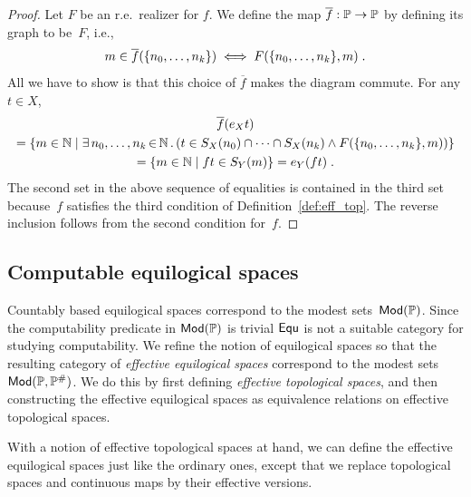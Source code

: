 \begin{proof}
  Let $F$ be an r.e.~realizer for $f$.  We define the map
  $\overline{f}: \mathbb{P} \to \mathbb{P}$ by defining its graph to be~$F$, i.e.,
  \begin{equation*}
    m \in \overline{f}(\{n_0, \ldots, n_k\})
    \iff
    F(\{n_0, \ldots, n_k\}, m) \;.
  \end{equation*}
  All we have to show is that this choice of $\overline{f}$ makes 
  the diagram commute. For any $t \in X$,
  \begin{multline*}
    \overline{f}(e_X t) \\
      = \{m \in \mathbb{N} \mid 
      \exists\, n_0, \ldots, n_k \,{\in}\, \mathbb{N}\,.\left(
        t \in S_X(n_0) \cap \cdots \cap S_X(n_k) \land
        F(\{n_0, \ldots, n_k\}, m)
        \right)
      \} \\
    = \{m \in \mathbb{N} \mid f t \in S_Y(m)\}
    = e_Y(f t) \;.
  \end{multline*}
  The second set in the above sequence of equalities is contained in
  the third set because~$f$ satisfies the third condition of
  Definition~\ref{def:eff_top}. The reverse inclusion follows from the
  second condition for~$f$.
\end{proof}



\subsection{Computable equilogical spaces}
\label{sec:computable-equ}


Countably based equilogical spaces correspond to the modest
sets~$\mathsf{Mod}(\mathbb{P})$. Since the computability predicate in $\mathsf{Mod}(\mathbb{P})$ is
trivial $\mathsf{Equ}$ is not a suitable category for studying computability.
We refine the notion of equilogical spaces so that the resulting
category of \emph{effective equilogical spaces} correspond to the
modest sets~$\mathsf{Mod}(\mathbb{P}, \mathbb{P}^{\#})$. We do this by first defining
\emph{effective topological spaces}, and then constructing the
effective equilogical spaces as equivalence relations on effective
topological spaces.

With a notion of effective topological spaces at hand, we can define
the effective equilogical spaces just like the ordinary ones, except
that we replace topological spaces and continuous maps by their
effective versions.

